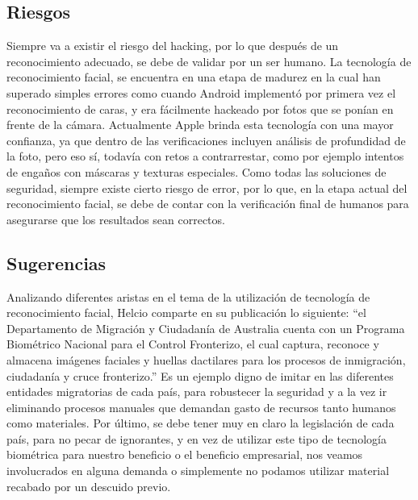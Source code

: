 \documentclass[conference]{IEEEtran}
\begin{document}
\subsection{Riesgos}
Siempre va a existir el riesgo del hacking, por lo que después de un reconocimiento adecuado, se debe de validar por un ser humano. La tecnología de reconocimiento facial, se encuentra en una etapa de madurez en la cual han superado simples errores como cuando Android implementó por primera vez el reconocimiento de caras, y era fácilmente hackeado por fotos que se ponían en frente de la cámara. Actualmente Apple brinda esta tecnología con una mayor confianza, ya que dentro de las verificaciones incluyen análisis de profundidad de la foto, pero eso sí, todavía con retos a contrarrestar, como por ejemplo intentos de engaños con máscaras y texturas especiales.
Como todas las soluciones de seguridad, siempre existe cierto riesgo de error, por lo que, en la etapa actual del reconocimiento facial, se debe de contar con la verificación final de humanos para asegurarse que los resultados sean correctos. 


\subsection{Sugerencias}
Analizando diferentes aristas en el tema de la utilización de tecnología de reconocimiento facial, Helcio comparte en su publicación lo siguiente:  “el Departamento de Migración y Ciudadanía de Australia cuenta con un Programa Biométrico Nacional para el Control Fronterizo, el cual captura, reconoce y almacena imágenes faciales y huellas dactilares para los procesos de inmigración, ciudadanía y cruce fronterizo.” \cite{b2}
Es un ejemplo digno de imitar en las diferentes entidades migratorias de cada país, para robustecer la seguridad y a la vez ir eliminando procesos manuales que demandan gasto de recursos tanto humanos como materiales.
Por último, se debe tener muy en claro la legislación de cada país, para no pecar de ignorantes, y en vez de utilizar este tipo de tecnología biométrica para nuestro beneficio o el beneficio empresarial, nos veamos involucrados en alguna demanda o simplemente no podamos utilizar material recabado por un descuido previo.
\end{document}
